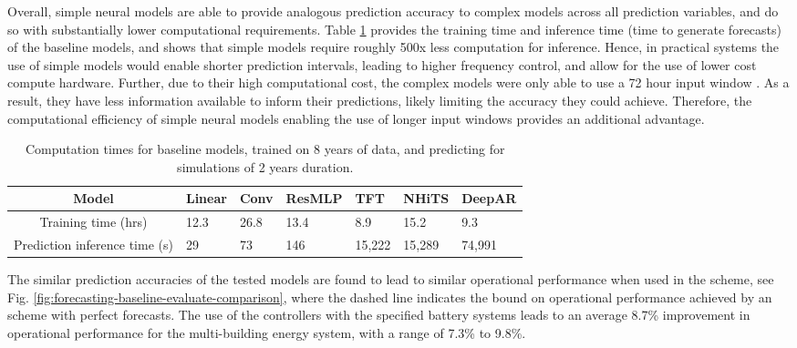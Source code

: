 Overall, simple neural models are able to provide analogous prediction accuracy to complex models across all prediction variables, and do so with substantially lower computational requirements. Table \ref{tab:forecasting-comp-times} provides the training time and inference time (time to generate forecasts) of the baseline models, and shows that simple models require roughly 500x less computation for inference. Hence, in practical systems the use of simple models would enable shorter prediction intervals, leading to higher frequency control, and allow for the use of lower cost compute hardware. Further, due to their high computational cost, the complex models were only able to use a 72 hour input window \citep{lopezsantos2022ApplicationTemporalFusion}. As a result, they have less information available to inform their predictions, likely limiting the accuracy they could achieve. Therefore, the computational efficiency of simple neural models enabling the use of longer input windows provides an additional advantage.\\

\begin{table}[h]
    \centering
    \renewcommand{\arraystretch}{1}
    \begin{tabularx}{\linewidth}{c|*{6}{X}} \toprule \toprule
        Model & Linear & Conv & ResMLP & TFT & NHiTS & DeepAR \\ \midrule
        Training time (hrs) & 12.3 & 26.8 & 13.4 & 8.9 & 15.2 & 9.3 \\
        Prediction inference time (s) & 29 & 73 & 146 & 15,222 & 15,289 & 74,991 \\ \bottomrule\bottomrule
    \end{tabularx}
    \smallskip
    \caption{Computation times for baseline models, trained on 8 years of data, and predicting for simulations of 2 years duration.}
    \label{tab:forecasting-comp-times}
\end{table}

The similar prediction accuracies of the tested models are found to lead to similar operational performance when used in the  scheme, see Fig. \ref{fig:forecasting-baseline-evaluate-comparison}, where the dashed line indicates the bound on operational performance achieved by an  scheme with perfect forecasts. The use of the  controllers with the specified battery systems leads to an average 8.7\% improvement in operational performance for the multi-building energy system, with a range of 7.3\% to 9.8\%.\\


